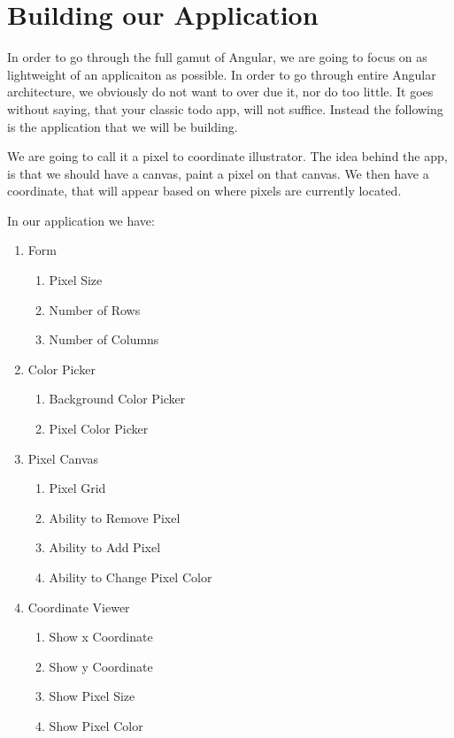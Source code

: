 \maketitle{}
\section{ Building our Application }

In order to go through the full gamut of Angular, we are going to focus on as
lightweight of an applicaiton as possible. In order to go through entire Angular
architecture, we obviously do not want to over due it, nor do too little. It
goes without saying, that your classic todo app, will not suffice. Instead the
following is the application that we will be building.

We are going to call it a pixel to coordinate illustrator. The idea behind the
app, is that we should have a canvas, paint a pixel on that canvas. We then have
a coordinate, that will appear based on where pixels are currently located.

In our application we have:
\begin{enumerate}
  \item Form
    \begin{enumerate}
      \item Pixel Size
      \item Number of Rows
      \item Number of Columns
    \end{enumerate}
  \item Color Picker
    \begin{enumerate}
      \item Background Color Picker
      \item Pixel Color Picker
    \end{enumerate}
  \item Pixel Canvas
    \begin{enumerate}
      \item Pixel Grid
      \item Ability to Remove Pixel
      \item Ability to Add Pixel
      \item Ability to Change Pixel Color
    \end{enumerate}
  \item Coordinate Viewer
    \begin{enumerate}
      \item Show x Coordinate
      \item Show y Coordinate
      \item Show Pixel Size
      \item Show Pixel Color
    \end{enumerate}
\end{enumerate}
